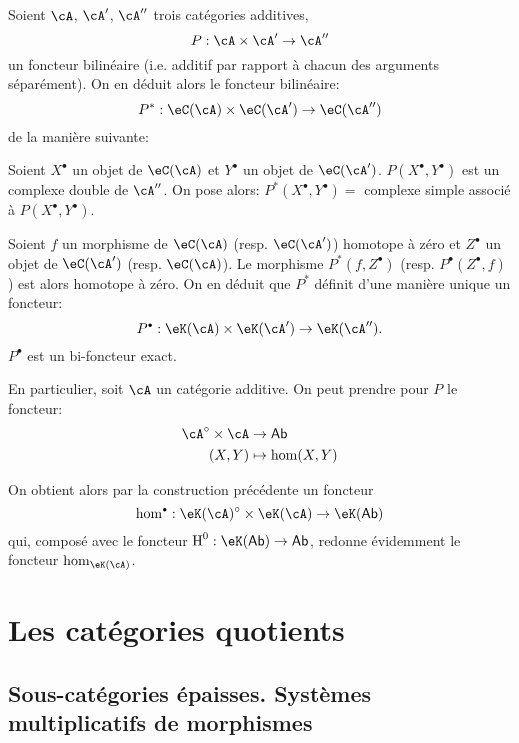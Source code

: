 Soient $\cA$, $\cA'$, $\cA''$ trois catégories additives, 
\[
  P:\cA\times \cA'\to \cA''
\]
un foncteur bilinéaire (i.e. additif par rapport à chacun des arguments 
séparément). On en déduit alors le foncteur bilinéaire: 
\[
  P^\ast:\eC(\cA)\times \eC(\cA') \to \eC(\cA'') 
\]
de la manière suivante: 

Soient $X^\bullet$ un objet de $\eC(\cA)$ et $Y^\bullet$ un objet de 
$\eC(\cA')$. $P(X^\bullet,Y^\bullet)$ est un complexe double de $\cA''$. On 
pose alors: $P^\ast(X^\bullet,Y^\bullet) = $ complexe simple associé à 
$P(X^\bullet,Y^\bullet)$. 

Soient $f$ un morphisme de $\eC(\cA)$ (resp. $\eC(\cA')$) homotope à zéro 
et $Z^\bullet$ un objet de $\eC(\cA')$ (resp. $\eC(\cA)$). Le morphisme 
$P^\ast(f,Z^\bullet)$ (resp. $P^\bullet(Z^\bullet,f)$) est alors homotope à 
zéro. On en déduit que $P^\ast$ définit d'une manière unique un 
foncteur: 
\[
  P^\bullet:\eK(\cA) \times \eK(\cA') \to \eK(\cA'') \text{.}
\]
$P^\bullet$ est un bi-foncteur exact. 

En particulier, soit $\cA$ un catégorie additive. On peut prendre pour $P$ le 
foncteur: 
\begin{align*}
  \cA^\circ\times \cA &\to \mathsf{Ab} \\
  (X,Y) &\mapsto \hom(X,Y) 
\end{align*}

On obtient alors par la construction précédente un foncteur 
\[
  \hom^\bullet:\eK(\cA)^\circ \times \eK(\cA) \to \eK(\mathsf{Ab}) 
\]
qui, composé avec le foncteur $\h^0:\eK(\mathsf{Ab})\to \mathsf{Ab}$, 
redonne évidemment le foncteur $\hom_{\eK(\cA)}$. 




















\section{Les catégories quotients}\label{VIII:2}










\subsection{Sous-catégories épaisses. Systèmes multiplicatifs de morphismes}\label{VIII:2-1}

